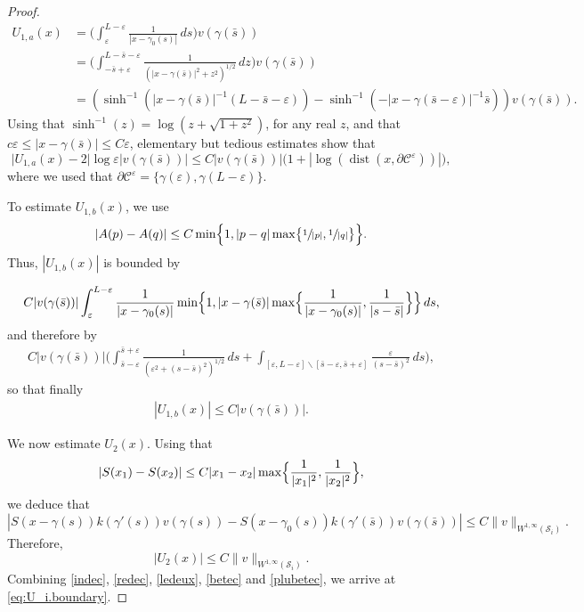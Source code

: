 \documentclass[11pt]{article}
\let\eps\varepsilon
\newcommand{\dd}{\,d}
\DeclareMathOperator{\dist}{dist}
\theoremstyle{definition}
\theoremstyle{remark}
\begin{document}
\begin{proof}
\begin{align}
\nonumber
U_{1,a} (x) &=
\biggl(\int_\eps^{L-\eps} \frac 1 {|x - \gamma_0(s)|} \dd s \biggr) v(\gamma (\bar s))
\\\label{here}
&= \biggl(\int_{- \bar s + \eps}^{L - \bar s - \eps} \frac{1}{(|x - \gamma(\bar s)|^2 + z^2)^{1/2}} \dd z \biggr) v(\gamma (\bar s))
\\ \nonumber
&= (\sinh^{-1}(|x - \gamma(\bar s)|^{-1} (L- \bar s - \eps)) - \sinh^{-1}(- |x - \gamma(\bar s - \eps)|^{-1} \bar s)) v(\gamma (\bar s)).
\end{align}
Using that $\sinh^{-1}(z) = \log(z + \sqrt{1 + z^2})$, for any real $z$, and that $c \eps \leq |x - \gamma(\bar s)| \leq C \eps$, elementary but tedious estimates show
that
\begin{equation}
\label{ledeux}
\big|U_{1,a} (x) - 2 \left|\log \eps \right| v(\gamma (\bar s))\big| \leq C |v(\gamma (\bar s))| { \bigl(1 + \left|\log(\dist(x,\partial \mathcal C^\eps))\right| \bigr)},
\end{equation}
{where we used that $\partial \mathcal C^\eps = \{\gamma(\eps),\gamma(L - \eps)\}$.}

To estimate $U_{1,b} (x)$, we use
\begin{equation}
|A(p) - A(q)| \leq C \min\Bigl\{ 1, |p-q| \max \bigl\{\sfrac 1 {|p|}, \sfrac 1 {|q|} \bigr\} \Bigr\}.
\end{equation}
Thus, $ |U_{1,b} (x)| $ is bounded by

\begin{gather*}
C {|v(\gamma (\bar s))|} \int_\eps^{L-\eps} \frac 1 {|x - \gamma_0(s)|} \min\Bigl\{ 1, |x - \gamma(\bar s)| \max \Bigl\{\frac 1 {|x - \gamma_0(s)|}, \frac 1 {|s-\bar s|} \Bigr\} \Bigr\} \dd s,
\end{gather*}
and therefore by
\begin{gather*}
C{|v(\gamma (\bar s))|} \biggl(\int_{\bar s - \eps}^{\bar s + \eps} \frac 1 {(\eps^2 + (s - \bar s)^2)^{1/2}} \dd s + \int_{[\eps,L -\eps] \smallsetminus [\bar s - \eps, \bar s + \eps]} \frac \eps {(s - \bar s)^2} \dd s \biggr),
\end{gather*}
so that finally
\begin{gather}
\label{betec}
|U_{1,b} (x)| \leq C {|v(\gamma (\bar s))|}.
\end{gather}

We now estimate $U_2 (x)$.
Using that
\begin{equation}
|S(x_1) - S(x_2)| \leq C |x_1 - x_2| \max \Bigl\{\frac 1 {|x_1|^2}, \frac 1 {|x_2|^2} \Bigr\},
\end{equation}
we deduce that
\begin{equation*}
|S(x - \gamma(s)) k(\gamma'(s)) v(\gamma (s)) - S(x - \gamma_0(s)) k(\gamma'(\bar s)) v(\gamma (\bar s))|
\leq C{\|v\|_{W^{1,\infty} (\mathcal S_i)}}.
\end{equation*}
Therefore,
\begin{equation}
\label{plubetec}
|U_2 (x) |\leq C{\|v\|_{W^{1,\infty} (\mathcal S_i)}}.
\end{equation}
Combining \eqref{indec}, \eqref{redec}, \eqref{ledeux}, \eqref{betec} and \eqref{plubetec}, we arrive at \eqref{eq:U_i.boundary}.
\end{proof}
\end{document}
